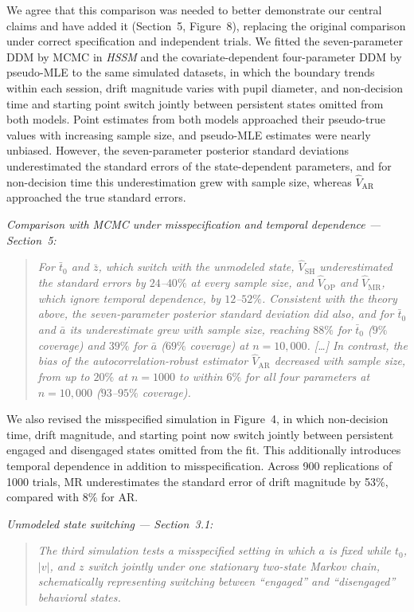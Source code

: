 \documentclass[00-main.tex]{subfiles}
\newcommand{\manuscriptquote}[1]{\begin{quote}\textit{#1}\end{quote}}
\begin{document}
We agree that this comparison was needed to better demonstrate our central claims and have added it (Section~5, Figure~8), replacing the original comparison under correct specification and independent trials. We fitted the seven-parameter DDM by MCMC in \emph{HSSM} and the covariate-dependent four-parameter DDM by pseudo-MLE to the same simulated datasets, in which the boundary trends within each session, drift magnitude varies with pupil diameter, and non-decision time and starting point switch jointly between persistent states omitted from both models. Point estimates from both models approached their pseudo-true values with increasing sample size, and pseudo-MLE estimates were nearly unbiased. However, the seven-parameter posterior standard deviations underestimated the standard errors of the state-dependent parameters, and for non-decision time this underestimation grew with sample size, whereas $\widehat{V}_\text{AR}$ approached the true standard errors.

\emph{Comparison with MCMC under misspecification and temporal dependence --- Section~5:}

\manuscriptquote{For $\bar{t}_0$ and $\bar{z}$, which switch with the unmodeled state, $\widehat{V}_\text{SH}$ underestimated the standard errors by $24$--$40\%$ at every sample size, and $\widehat{V}_\text{OP}$ and $\widehat{V}_\text{MR}$, which ignore temporal dependence, by $12$--$52\%$. Consistent with the theory above, the seven-parameter posterior standard deviation did also, and for $\bar{t}_0$ and $\bar{a}$ its underestimate grew with sample size, reaching $88\%$ for $\bar{t}_0$ ($9\%$ coverage) and $39\%$ for $\bar{a}$ ($69\%$ coverage) at $n=10{,}000$. [\ldots] In contrast, the bias of the autocorrelation-robust estimator $\widehat{V}_\text{AR}$ decreased with sample size, from up to $20\%$ at $n=1000$ to within $6\%$ for all four parameters at $n=10{,}000$ ($93$--$95\%$ coverage).}

We also revised the misspecified simulation in Figure~4, in which non-decision time, drift magnitude, and starting point now switch jointly between persistent engaged and disengaged states omitted from the fit. This additionally introduces temporal dependence in addition to misspecification. Across 900 replications of 1000 trials, MR underestimates the standard error of drift magnitude by 53\%, compared with 8\% for AR.

\emph{Unmodeled state switching --- Section~3.1:}

\manuscriptquote{The third simulation tests a misspecified setting in which $a$ is fixed while $t_0$, $|v|$, and $z$ switch jointly under one stationary two-state Markov chain, schematically representing switching between ``engaged'' and ``disengaged'' behavioral states.}
\end{document}
